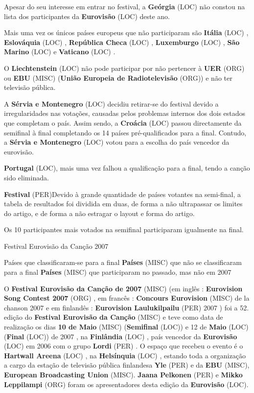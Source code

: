 \documentclass[12pt,a4paper]{article}
\begin{document}
Apesar do seu interesse em entrar no festival, a \textbf{Geórgia} (LOC) não constou na lista dos participantes da \textbf{Eurovisão} (LOC) deste ano.

Mais uma vez os únicos países europeus que não participaram são \textbf{Itália} (LOC) , \textbf{Eslováquia} (LOC) , \textbf{República Checa} (LOC) , \textbf{Luxemburgo} (LOC) , \textbf{São Marino} (LOC) e \textbf{Vaticano} (LOC) .

O \textbf{Liechtenstein} (LOC) não pode participar por não pertencer à \textbf{UER} (ORG) ou \textbf{EBU} (MISC) (\textbf{União Europeia de Radiotelevisão} (ORG)) e não ter televisão pública.

A \textbf{Sérvia e Montenegro} (LOC) decidiu retirar-se do festival devido a irregularidades nas votações, causadas pelos problemas internos dos dois estados que completam o país. Assim sendo, a \textbf{Croácia} (LOC) passou directamente da semifinal à final completando os 14 países pré-qualificados para a final. Contudo, a \textbf{Sérvia e Montenegro} (LOC) votou para a escolha do país vencedor da eurovisão.

\textbf{Portugal} (LOC), mais uma vez falhou a qualificação para a final, tendo a canção sido eliminada.



\textbf{Festival} (PER)Devido à grande quantidade de países votantes na semi-final, a tabela de resultados foi dividida em duas, de forma a não ultrapassar os limites do artigo, e de forma a não estragar o layout e forma do artigo.

Os 10 participantes mais votados na semifinal participaram igualmente na final.



Festival Eurovisão da Canção 2007



Países que classificaram-se para a final \textbf{Países} (MISC) que não se classificaram para a final \textbf{Países} (MISC) que participaram no passado, mas não em 2007

O \textbf{Festival Eurovisão da Canção de 2007} (MISC) (em inglês : \textbf{Eurovision Song Contest 2007} (ORG) , em francês : \textbf{Concours Eurovision} (MISC) de la chanson 2007 e em finlandês : \textbf{Eurovision Laulukilpailu} (PER) 2007 ) foi a 52. edição do \textbf{Festival Eurovisão da Canção} (MISC) e teve como data de realização os dias \textbf{10 de Maio} (MISC) (\textbf{Semifinal} (LOC)) e 12 de \textbf{Maio} (LOC) (\textbf{Final} (LOC)) de 2007 , na \textbf{Finlândia} (LOC) , país vencedor da \textbf{Eurovisão} (LOC) em 2006 com o grupo \textbf{Lordi} (PER) . O espaço que recebeu o evento é o \textbf{Hartwall Areena} (LOC) , na \textbf{Helsínquia} (LOC) , estando toda a organização a cargo da estação de televisão pública finlandesa \textbf{Yle} (PER) e da \textbf{EBU} (MISC), \textbf{European Broadcasting Union} (MISC). \textbf{Jaana Pelkonen} (PER) e \textbf{Mikko Leppilampi} (ORG) foram os apresentadores desta edição da \textbf{Eurovisão} (LOC).
\end{document}
